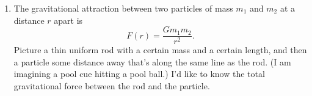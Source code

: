 \documentclass[12pt]{article}
\begin{document}
\begin{enumerate}[leftmargin=0pt]
\item The gravitational attraction between two particles of mass \(m_1\) and \(m_2\) at a distance \(r\) apart is
\[F(r) = \frac{Gm_1 m_2}{r^2}.\]
Picture a thin uniform rod with a certain mass and a certain length, and then a particle some distance away that's along the same line as the rod. (I am imagining a pool cue hitting a pool ball.) I'd like to know the total gravitational force between the rod and the particle.
\end{enumerate}
\end{document}
